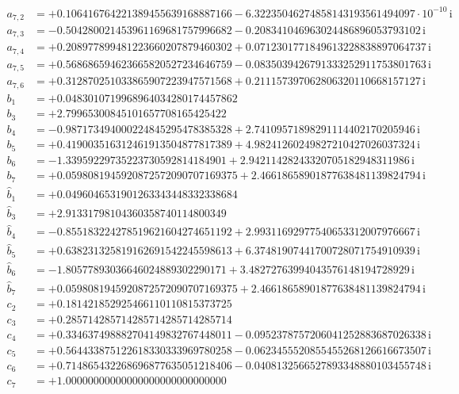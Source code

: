 {\begin{align*}
a_{7,2} &= +0.106416764221389455639168887166 - 6.32235046274858143193561494097\cdot10^{-10}\,\mathrm{i}\\
a_{7,3} &= -0.504280021453961169681757996682 - 0.208341046963024486896053793102\,\mathrm{i}\\
a_{7,4} &= +0.208977899481223660207879460302 + 0.0712301771849613228838897064737\,\mathrm{i}\\
a_{7,5} &= +0.568686594623665820527234646759 - 0.0835039426791333252911753801763\,\mathrm{i}\\
a_{7,6} &= +0.312870251033865907223947571568 + 0.211157397062806320110668157127\,\mathrm{i}\\[1mm]
b_{1} &= +0.0483010719968964034280174457862\\
b_{3} &= +2.79965300845101657708165425422\\
b_{4} &= -0.987173494000224845295478385328 + 2.74109571898291114402170205946\,\mathrm{i}\\
b_{5} &= +0.419003516312461913504877817389 + 4.98241260249827210427026037324\,\mathrm{i}\\
b_{6} &= -1.33959229735223730592814184901 + 2.94211428243320705182948311986\,\mathrm{i}\\
b_{7} &= +0.0598081945920872572090707169375 + 2.46618658901877638481139824794\,\mathrm{i}\\[1mm]
\hat b_{1} &= +0.0496046531901263343448332338684\\
\hat b_{3} &= +2.91331798104360358740114800349\\
\hat b_{4} &= -0.855183224278519621604274651192 + 2.99311692977540653312007976667\,\mathrm{i}\\
\hat b_{5} &= +0.638231325819162691542245598613 + 6.37481907441700728071754910939\,\mathrm{i}\\
\hat b_{6} &= -1.80577893036646024889302290171 + 3.48272763994043576148194728929\,\mathrm{i}\\
\hat b_{7} &= +0.0598081945920872572090707169375 + 2.46618658901877638481139824794\,\mathrm{i}\\[1mm]
c_{2} &= +0.181421852925466110110815373725\\
c_{3} &= +0.285714285714285714285714285714\\
c_{4} &= +0.334637498882704149832767448011 - 0.0952378757206041252883687026338\,\mathrm{i}\\
c_{5} &= +0.564433875122618330333969780258 - 0.0623455520855455268126616673507\,\mathrm{i}\\
c_{6} &= +0.714865432268696877635051218406 - 0.0408132566527893348880103455748\,\mathrm{i}\\
c_{7} &= +1.00000000000000000000000000000
\end{align*}
}

